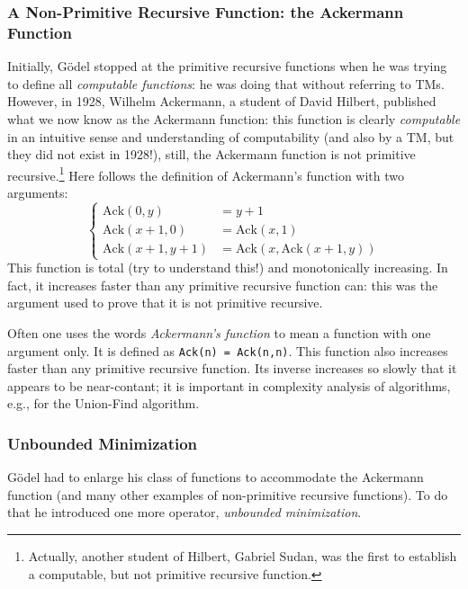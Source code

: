 \subsubsection{A Non-Primitive Recursive Function: the Ackermann Function}

Initially, Gödel stopped at the primitive recursive functions when he
was trying to define all {\em computable functions}: he was doing that
without referring to TMs. However, in 1928, Wilhelm Ackermann, a
student of David Hilbert, published what we now know as the Ackermann
function: this function is clearly {\em computable} in an intuitive
sense and understanding of computability (and also by a TM, but they
did not exist in 1928!), still, the Ackermann function is not
primitive recursive.\footnote{Actually, another student of Hilbert,
 Gabriel Sudan, was the first to establish a computable, but not
 primitive recursive function.} Here follows the definition of
Ackermann's function with two arguments:
\begin{equation*}
\left\{\begin{aligned}
	\text{Ack}(0, y) &= y + 1\\
	\text{Ack}(x + 1, 0) &= \text{Ack}(x, 1) \\
	\text{Ack}(x + 1, y + 1) &= \text{Ack}(x, \text{Ack}(x + 1, y ))
\end{aligned}\right.
\end{equation*}
This function is total (try to understand this!) and monotonically increasing. 
In fact, it increases faster than any primitive recursive function can: this
was the argument used to prove that it is not primitive recursive.

Often one uses the words {\em Ackermann's function} to mean a function
with one argument only. It is defined as
\verb|Ack(n) = Ack(n,n)|. This function also increases faster than any
primitive recursive function. Its inverse increases so slowly that it appears
to be near-contant; it is important in complexity analysis of algorithms, e.g.,
for the Union-Find algorithm.

\subsubsection{Unbounded Minimization}

Gödel had to enlarge his class of functions to accommodate the Ackermann
function (and many other examples of non-primitive recursive functions).
To do that he introduced one more operator, {\em unbounded minimization}.

